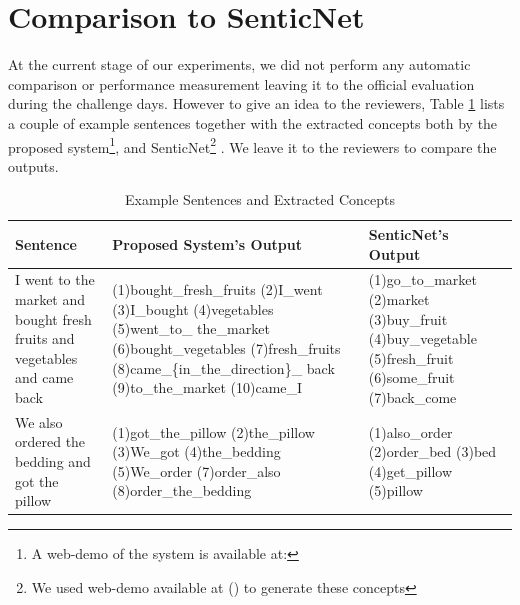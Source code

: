 \documentclass[runningheads,a4paper]{llncs}
\begin{document}
\section{Comparison to SenticNet}
At the current stage of our experiments, we did not perform any automatic comparison or performance measurement leaving it to the official evaluation during the challenge days. However to give an idea to the reviewers, Table \ref{tab:sen-conc-compare} lists a couple of example sentences together with the extracted concepts both by the proposed system\footnote{A web-demo of the system is available at:}, and SenticNet\footnote{We used web-demo available at () to generate these concepts} \cite{senticnet}. We leave it to the reviewers to compare the outputs. 
\begin{table}[!h]
\centering
\begin{tabular}{>{\raggedright}p{3cm}>{\raggedright}p{5.5cm}p{3.5cm}<{\raggedright}}
\hline \textbf{Sentence} & \textbf{Proposed System's Output}  & \textbf{SenticNet's Output} \\ 
\hline I went to the market and bought fresh fruits and vegetables and came back &(1)bought\_fresh\_fruits (2)I\_went (3)I\_bought (4)vegetables (5)went\_to\_ the\_market (6)bought\_vegetables (7)fresh\_fruits (8)came\_\{in\_the\_direction\}\_ back (9)to\_the\_market (10)came\_I &(1)go\_to\_market (2)market (3)buy\_fruit (4)buy\_vegetable (5)fresh\_fruit (6)some\_fruit  (7)back\_come\\ 
\hline We also ordered the bedding and got the pillow & (1)got\_the\_pillow (2)the\_pillow (3)We\_got (4)the\_bedding (5)We\_order (7)order\_also (8)order\_the\_bedding & (1)also\_order (2)order\_bed (3)bed (4)get\_pillow (5)pillow \\ 
\hline 
\end{tabular}  
\caption{Example Sentences and Extracted Concepts}
\label{tab:sen-conc-compare}
\end{table}

\end{document}
